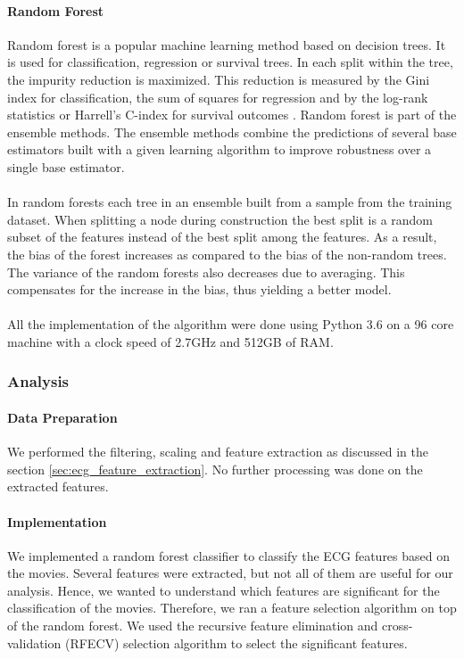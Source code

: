\paragraph{Random Forest} Random forest \cite{breiman2001random} is a popular machine learning method based on decision trees. It is used for classification, regression or survival trees. In each split within the tree, the impurity reduction is maximized. This reduction is measured by the Gini index for classification, the sum of squares for regression and by the log-rank statistics or Harrell's C-index for survival outcomes \cite{wright_splitting_2019}. Random forest is part of the  ensemble methods. The ensemble methods combine the predictions of several base estimators built with a given learning algorithm to improve robustness over a single base estimator.

\paragraph{} In random forests each tree in an ensemble built from a sample from the training dataset. When splitting a node during construction the best split is a random subset of the features instead of the best split among the features. As a result, the bias of the forest increases as compared to the bias of the non-random trees. The variance of the random forests also decreases due to averaging. This compensates for the increase in the bias, thus yielding a better model.
\paragraph{} All the implementation of the algorithm were done using Python 3.6 on a 96 core machine with a clock speed of 2.7GHz and 512GB of RAM.

\subsubsection{Analysis}
\paragraph{Data Preparation}  We performed the filtering, scaling and feature extraction as discussed in the section \ref{sec:ecg_feature_extraction}. No further processing was done on the extracted features.

\paragraph{Implementation} We implemented a random forest classifier to classify the ECG features based on the movies. Several features were extracted, but not all of them are useful for our analysis. Hence, we wanted to understand which features are significant for the classification of the movies. Therefore, we ran a feature selection algorithm on top of the random forest. We used the recursive feature elimination and cross-validation (RFECV) \cite{sklearn_rfecv} selection algorithm to select the significant features.


